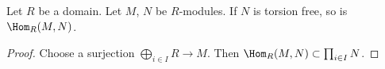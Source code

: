 \begin{lemma}
\label{lemma-hom-into-torsion-free}
Let $R$ be a domain. Let $M$, $N$ be $R$-modules.
If $N$ is torsion free, so is $\Hom_R(M, N)$.
\end{lemma}

\begin{proof}
Choose a surjection $\bigoplus_{i \in I} R \to M$.
Then $\Hom_R(M, N) \subset \prod_{i \in I} N$.
\end{proof}




